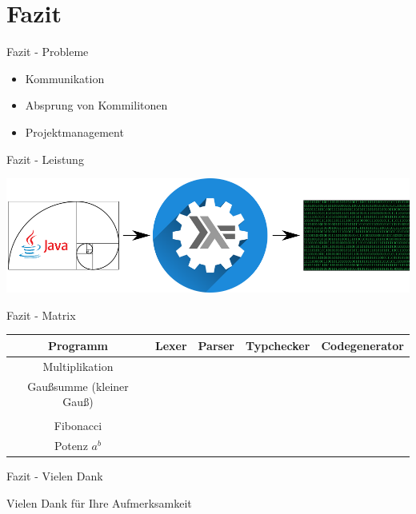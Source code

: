 \section{Fazit}

\begin{frame}{Fazit - Probleme}

\begin{itemize}
	\item Kommunikation
	\item Absprung von Kommilitonen
	\item Projektmanagement
\end{itemize}

\end{frame}


\begin{frame}{Fazit - Leistung}

\begin{center}
	\includegraphics{images/fazit/fazit.png}
\end{center}

\end{frame}


\begin{frame}{Fazit - Matrix}

\begin{center}
	\begin{tabular}{|c|c|c|c|c|}
		\hline
		Programm & Lexer & Parser & Typchecker & Codegenerator \\
		\hline
		Multiplikation & \checkmark & \checkmark & \checkmark & \checkmark \\
		\hline
		Gaußsumme (kleiner Gauß) & \checkmark & \checkmark & \checkmark & \checkmark \\
		\hline
		\text{Fakultät} & \checkmark & \checkmark & \checkmark & \checkmark \\
		\hline
		Fibonacci & \checkmark & \checkmark & \checkmark & \checkmark \\
		\hline
		Potenz $ a^{b} $ & \checkmark & \checkmark & \checkmark & \checkmark\\
		\hline
	\end{tabular}
\end{center}

\end{frame}


\begin{frame}{Fazit - Vielen Dank}

\begin{center}
	\Huge Vielen Dank für Ihre Aufmerksamkeit
\end{center}

\end{frame}